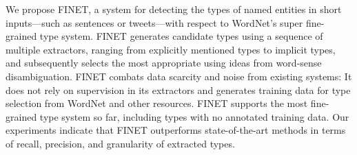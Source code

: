We propose FINET, a system for detecting the types of named entities in short inputs---such as sentences or tweets---with respect to WordNet's super fine-grained type system. FINET generates candidate types using a sequence of multiple extractors, ranging from explicitly mentioned types to implicit types, and subsequently selects the most appropriate using ideas from word-sense disambiguation. FINET combats data scarcity and noise from existing systems: It does not rely on supervision in its extractors and generates training data for type selection from WordNet and other resources. FINET supports the most fine-grained type system so far, including types with no annotated training data. Our experiments indicate that FINET outperforms state-of-the-art methods in terms of recall, precision, and granularity of extracted types.
